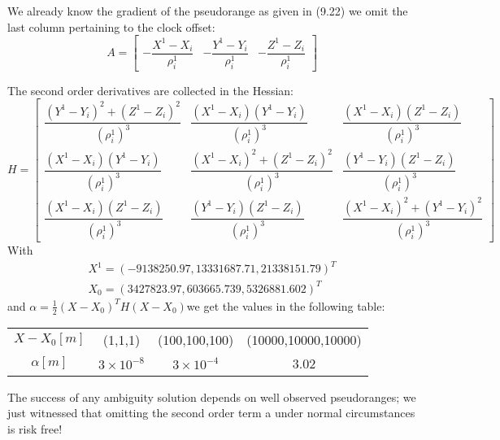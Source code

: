 		We already know the gradient of the pseudorange as given in (9.22) we omit the last column pertaining to the clock offset:
		\begin{equation}\label{eq:9.30}
			A=\begin{bmatrix}
			-\dfrac{X^1-X_i}{\rho^1_i} & -\dfrac{Y^1-Y_i}{\rho^1_i} & -\dfrac{Z^1-Z_i}{\rho^1_i}
			\end{bmatrix}
		\end{equation}
			
		The second order derivatives are collected in the Hessian:
		\begin{equation}\label{eq:9.31}
			H=
			\begin{bmatrix}
				\dfrac{(Y^1-Y_i)^2+(Z^1-Z_i)^2}{(\rho^1_i)^3} & \dfrac{(X^1-X_i)(Y^1-Y_i)}{(\rho^1_i)^3} 		& \dfrac{(X^1-X_i)(Z^1-Z_i)}{(\rho^1_i)^3} \\
				\dfrac{(X^1-X_i)(Y^1-Y_i)}{(\rho^1_i)^3}       & \dfrac{(X^1-X_i)^2+(Z^1-Z_i)^2}{(\rho^1_i)^3}   & \dfrac{(Y^1-Y_i)(Z^1-Z_i)}{(\rho^1_i)^3} \\
				\dfrac{(X^1-X_i)(Z^1-Z_i)}{(\rho^1_i)^3} 	  & \dfrac{(Y^1-Y_i)(Z^1-Z_i)}{(\rho^1_i)^3} 		& \dfrac{(X^1-X_i)^2+(Y^1-Y_i)^2}{(\rho^1_i)^3}		
			\end{bmatrix}
		\end{equation}
		With
		\[
		\begin{split}
		X^1=(-9138250.97,13331687.71,21338151.79)^T \\
		X_0=(3427823.97,603665.739,5326881.602)^T
		\end{split}
		\]
		and $\alpha=\frac{1}{2}(X-X_0)^TH(X-X_0)$we get the values in the following table:
		\begin{table}
			\begin{tabular}{cccc}
				\hline
				$X-X_0[m]$ & (1,1,1) & (100,100,100) & (10000,10000,10000) \\ 
				$\alpha [m]$ & $3\times10^{-8}$ & $3\times10^{-4}$ & 3.02 \\ 
				\hline
			\end{tabular} 
		\end{table}
		The success of any ambiguity solution depends on well observed pseudoranges; we just witnessed that omitting the second order term a under normal circumstances is risk free!
			

